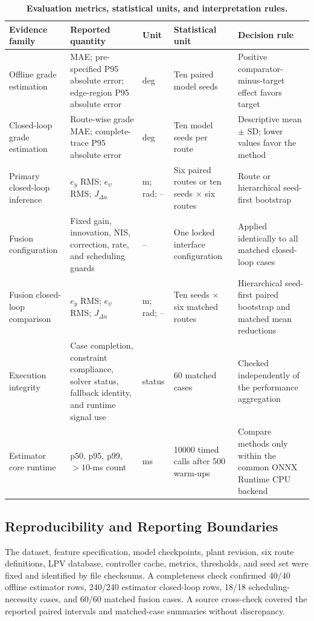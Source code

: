 \documentclass{ieeeaccess}
\begin{document}
\begin{table}[!tbp]
\centering
\caption{\textbf{Evaluation metrics, statistical units, and interpretation rules.}}
\label{tab:evaluation_protocol}
\scriptsize
\setlength{\tabcolsep}{3.0pt}
\setlength{\tabcolsep}{3pt}
\begin{tabular}{|p{}|p{}|p{}|p{}|p{}|}
\hline
Evidence family & Reported quantity & Unit & Statistical unit & Decision rule \\
\hline
Offline grade estimation & MAE; pre-specified P95 absolute error; edge-region P95 absolute error & deg & Ten paired model seeds & Positive comparator-minus-target effect favors target \\
Closed-loop grade estimation & Route-wise grade MAE; complete-trace P95 absolute error & deg & Ten model seeds per route & Descriptive mean $\pm$ SD; lower values favor the method \\
Primary closed-loop inference & $e_y$ RMS; $e_\psi$ RMS; $J_{\Delta u}$ & m; rad; -- & Six paired routes or ten seeds $\times$ six routes & Route or hierarchical seed-first bootstrap \\
Fusion configuration & Fixed gain, innovation, NIS, correction, rate, and scheduling guards & -- & One locked interface configuration & Applied identically to all matched closed-loop cases \\
Fusion closed-loop comparison & $e_y$ RMS; $e_\psi$ RMS; $J_{\Delta u}$ & m; rad; -- & Ten seeds $\times$ six matched routes & Hierarchical seed-first paired bootstrap and matched mean reductions \\
Execution integrity & Case completion, constraint compliance, solver status, fallback identity, and runtime signal use & status & 60 matched cases & Checked independently of the performance aggregation \\
Estimator core runtime & p50, p95, p99, $>10$-ms count & ms & 10000 timed calls after 500 warm-ups & Compare methods only within the common ONNX Runtime CPU backend \\
\hline
\end{tabular}
\end{table}

\subsection{Reproducibility and Reporting Boundaries}

The dataset, feature specification, model checkpoints, plant revision, six route definitions, LPV database, controller cache, metrics, thresholds, and seed set were fixed and identified by file checksums. A completeness check confirmed 40/40 offline estimator rows, 240/240 estimator closed-loop rows, 18/18 scheduling-necessity cases, and 60/60 matched fusion cases. A source cross-check covered the reported paired intervals and matched-case summaries without discrepancy.
\end{document}
